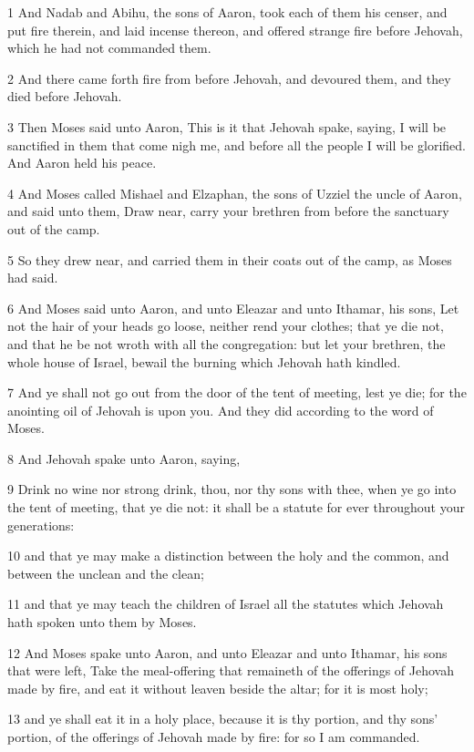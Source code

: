 \par 1 And Nadab and Abihu, the sons of Aaron, took each of them his censer, and put fire therein, and laid incense thereon, and offered strange fire before Jehovah, which he had not commanded them.
\par 2 And there came forth fire from before Jehovah, and devoured them, and they died before Jehovah.
\par 3 Then Moses said unto Aaron, This is it that Jehovah spake, saying, I will be sanctified in them that come nigh me, and before all the people I will be glorified. And Aaron held his peace.
\par 4 And Moses called Mishael and Elzaphan, the sons of Uzziel the uncle of Aaron, and said unto them, Draw near, carry your brethren from before the sanctuary out of the camp.
\par 5 So they drew near, and carried them in their coats out of the camp, as Moses had said.
\par 6 And Moses said unto Aaron, and unto Eleazar and unto Ithamar, his sons, Let not the hair of your heads go loose, neither rend your clothes; that ye die not, and that he be not wroth with all the congregation: but let your brethren, the whole house of Israel, bewail the burning which Jehovah hath kindled.
\par 7 And ye shall not go out from the door of the tent of meeting, lest ye die; for the anointing oil of Jehovah is upon you. And they did according to the word of Moses.
\par 8 And Jehovah spake unto Aaron, saying,
\par 9 Drink no wine nor strong drink, thou, nor thy sons with thee, when ye go into the tent of meeting, that ye die not: it shall be a statute for ever throughout your generations:
\par 10 and that ye may make a distinction between the holy and the common, and between the unclean and the clean;
\par 11 and that ye may teach the children of Israel all the statutes which Jehovah hath spoken unto them by Moses.
\par 12 And Moses spake unto Aaron, and unto Eleazar and unto Ithamar, his sons that were left, Take the meal-offering that remaineth of the offerings of Jehovah made by fire, and eat it without leaven beside the altar; for it is most holy;
\par 13 and ye shall eat it in a holy place, because it is thy portion, and thy sons' portion, of the offerings of Jehovah made by fire: for so I am commanded.
